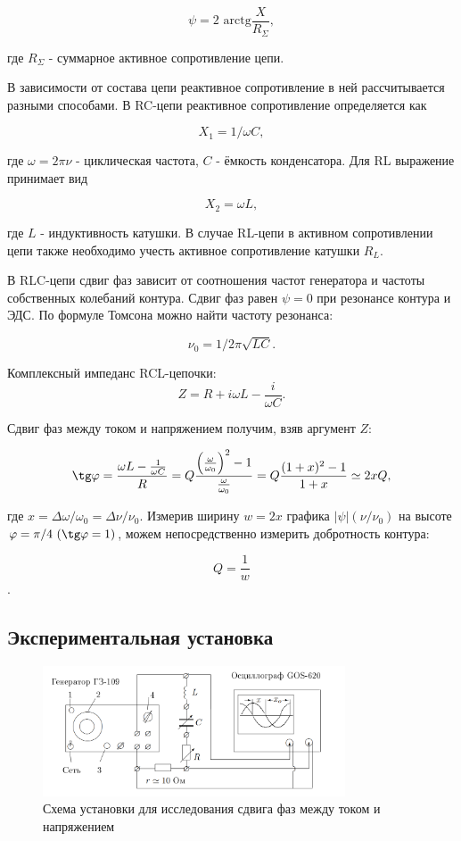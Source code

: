 \documentclass[a4paper,12pt]{article} %
\begin{document}
\begin{equation}
    \psi = 2\text{ arctg}\frac{X}{R_\Sigma},
\end{equation}

где $R_\Sigma$ - суммарное активное сопротивление цепи.

В зависимости от состава цепи реактивное сопротивление в ней рассчитывается разными способами. В RC-цепи реактивное сопротивление определяется как

\begin{equation}
    X_1 = 1/\omega C,
\end{equation}

где $\omega = 2\pi\nu$ - циклическая частота, $C$ - ёмкость конденсатора. Для RL выражение принимает вид

\begin{equation}
    X_2 = \omega L,
\end{equation}

где $L$ - индуктивность катушки. В случае RL-цепи в активном сопротивлении цепи также необходимо учесть активное сопротивление катушки $R_L$. 

В RLC-цепи сдвиг фаз зависит от соотношения частот генератора и частоты собственных колебаний контура. Сдвиг фаз равен $\psi = 0$ при резонансе контура и ЭДС. По формуле Томсона можно найти частоту резонанса:

\begin{equation}
    \nu_0 = 1/2\pi \sqrt{LC}.
\end{equation}

Комплексный импеданс RCL-цепочки:
$$Z=R+i\omega L - \frac{i}{\omega C}.$$

Сдвиг фаз между током и напряжением получим, взяв аргумент $Z$:

$$\tg\varphi = \frac{\omega L - \frac{1}{\omega C}}{R} = Q\frac{\left(\frac{\omega}{\omega_0}\right)^2 - 1}{\frac{\omega}{\omega_0}} = Q\frac{(1+x)^2-1}{1+x} \simeq 2x Q,$$

где $x = \Delta \omega / \omega_0 = \Delta \nu / \nu_0$. Измерив ширину $w=2x$ графика $|\psi|(\nu/\nu_0)$ на высоте $\varphi = \pi / 4\ (\tg\varphi = 1)$, можем непосредственно измерить добротность контура:

$$Q = \frac{1}{w}$$.

\subsection{Экспериментальная установка}

\begin{figure}
    \centering
    \includegraphics[width = 0.8\textwidth]{circuit1.png}
    \caption{Схема установки для исследования сдвига фаз между током и напряжением}
    \label{fig:circuit1}
\end{figure}
\end{document}
